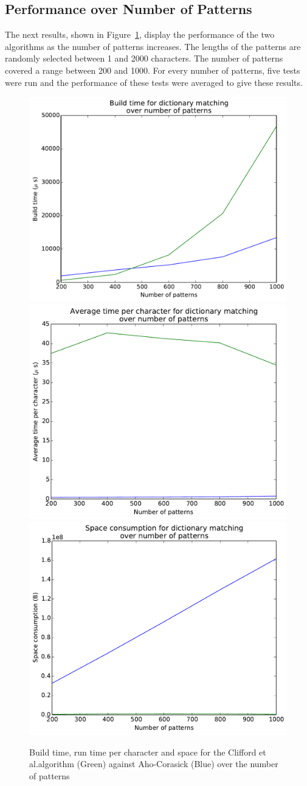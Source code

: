 \documentclass[ %
                    author={Dominic Joseph Moylett},
                    degree={MEng},
                     title={Dictionary Matching with Fingerprints},
                  subtitle={An Empirical Analysis},
                      type={research},
                      year={2015} ]{dissertation}
\begin{document}
\subsection{Performance over Number of Patterns}
\label{ssec:many-pattern-results}

The next results, shown in Figure~\ref{fig:many-pattern-results}, display the performance of the two algorithms as the number of patterns increases. The lengths of the patterns are randomly selected between 1 and 2000 characters. The number of patterns covered a range between 200 and 1000. For every number of patterns, five tests were run and the performance of these tests were averaged to give these results.

\begin{figure}[t]
\begin{center}
  \includegraphics[width=0.5\linewidth]{build_num_200_1000}\\
  \includegraphics[width=0.5\linewidth]{time_num_200_1000}\includegraphics[width=0.5\linewidth]{size_num_200_1000}
\end{center}
\caption{Build time, run time per character and space for the Clifford et al.\@ algorithm (Green) against Aho-Corasick (Blue) over the number of patterns}
\label{fig:many-pattern-results}
\end{figure}
\end{document}
